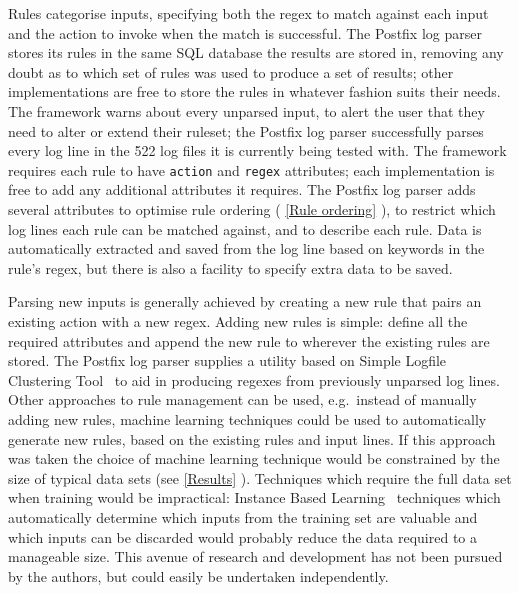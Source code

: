 \documentclass{svmult}
\newcommand{\sectionref}[1]{%
    \textsection{}\vref*{#1}%
}
\newcommand{\numberOFlogFILESall}[0]{%
    522%
}
\begin{document}
Rules categorise inputs, specifying both the regex to match against each
input and the action to invoke when the match is successful.  The Postfix
log parser stores its rules in the same SQL database the results are stored
in, removing any doubt as to which set of rules was used to produce a set
of results; other implementations are free to store the rules in whatever
fashion suits their needs.  The framework warns about every unparsed input,
to alert the user that they need to alter or extend their ruleset; the
Postfix log parser successfully parses every log line in the
\numberOFlogFILESall{} log files it is currently being tested with.  The
framework requires each rule to have \texttt{action} and \texttt{regex}
attributes; each implementation is free to add any additional attributes it
requires.  The Postfix log parser adds several attributes to optimise rule
ordering (\sectionref{Rule ordering}), to restrict which log lines each
rule can be matched against, and to describe each rule.  Data is
automatically extracted and saved from the log line based on keywords in
the rule's regex, but there is also a facility to specify extra data to be
saved.

Parsing new inputs is generally achieved by creating a new rule that pairs
an existing action with a new regex.  Adding new rules is simple: define
all the required attributes and append the new rule to wherever the
existing rules are stored.  The Postfix log parser supplies a utility based
on Simple Logfile Clustering Tool~\cite{slct-paper} to aid in producing
regexes from previously unparsed log lines.  Other approaches to rule
management can be used, e.g.\ instead of manually adding new rules, machine
learning techniques could be used to automatically generate new rules,
based on the existing rules and input lines.  If this approach was taken
the choice of machine learning technique would be constrained by the size
of typical data sets (see \sectionref{Results}).  Techniques which require
the full data set when training would be impractical: Instance Based
Learning~\cite{instance-based-learning} techniques which automatically
determine which inputs from the training set are valuable and which inputs
can be discarded would probably reduce the data required to a manageable
size.  This avenue of research and development has not been pursued by the
authors, but could easily be undertaken independently.
\end{document}
